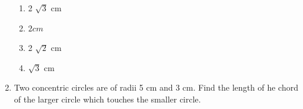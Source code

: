 \documentclass{article}
\begin{document}
\begin{enumerate}
\begin{figure}[H]
			\caption{}
			\label{fig}
		\end{figure}
		\begin{enumerate}
			\item 2 $ \sqrt{3} $ cm
			\item $ 2 cm $ 
			\item 2 $ \sqrt{2} $ cm
			\item $ \sqrt{3} $ cm
		\end{enumerate}
	\item Two concentric circles are of radii 5 cm and 3 cm. Find the length of he chord of the larger circle 
		which touches the smaller circle.






	
\end{enumerate}
\end{document}
